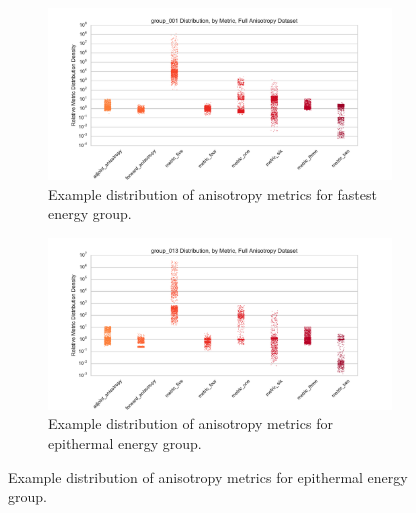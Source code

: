 \begin{figure}[htb]
  \centering
  \begin{subfigure}[t]{\textwidth}
    \centering
    \includegraphics[width=0.95\linewidth]{./chapters/characterization_probs/figures/sample_data/group_001_strip_full.pdf}
    \caption{Example distribution of anisotropy metrics for fastest energy group.}
    \label{fig:samplestrip001}
  \end{subfigure}
  \begin{subfigure}[t]{\textwidth}
    \centering
    \includegraphics[width=0.95\linewidth]{./chapters/characterization_probs/figures/sample_data/group_013_strip_full.pdf}
    \caption{Example distribution of anisotropy metrics for epithermal energy group.}
    \label{fig:samplestrip013}
  \end{subfigure}
\end{figure}
